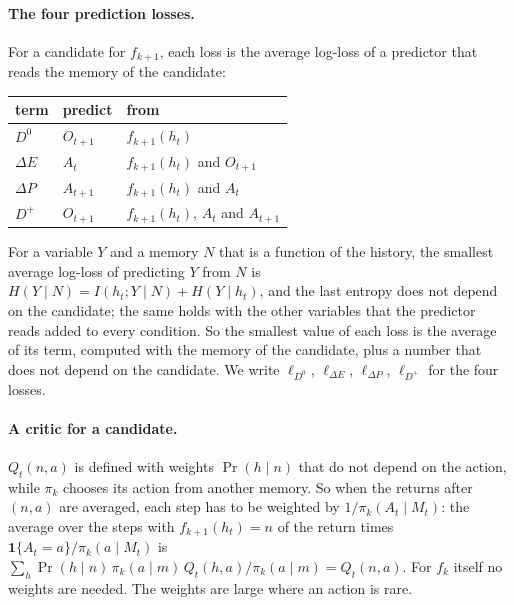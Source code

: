 \documentclass[11pt]{article}
\theoremstyle{definition}
\newcommand{\dE}{\Delta E}
\newcommand{\dP}{\Delta P}
\begin{document}
\paragraph{The four prediction losses.} For a candidate for $f_{k+1}$, each loss is the average log-loss of a predictor that reads the memory of the candidate:
\begin{center}
\small
\begin{tabular}{lll}
\hline
term & predict & from\\
\hline
$D^0$ & $O_{t+1}$ & $f_{k+1}(h_t)$\\
$\dE$ & $A_t$ & $f_{k+1}(h_t)$ and $O_{t+1}$\\
$\dP$ & $A_{t+1}$ & $f_{k+1}(h_t)$ and $A_t$\\
$D^+$ & $O_{t+1}$ & $f_{k+1}(h_t)$, $A_t$ and $A_{t+1}$\\
\hline
\end{tabular}
\end{center}
For a variable $Y$ and a memory $N$ that is a function of the history, the smallest average log-loss of predicting $Y$ from $N$ is $H(Y\mid N)=I(h_t;Y\mid N)+H(Y\mid h_t)$, and the last entropy does not depend on the candidate; the same holds with the other variables that the predictor reads added to every condition. So the smallest value of each loss is the average of its term, computed with the memory of the candidate, plus a number that does not depend on the candidate. We write $\ell_{D^0}$, $\ell_{\dE}$, $\ell_{\dP}$, $\ell_{D^+}$ for the four losses.

\paragraph{A critic for a candidate.} $Q_t(n,a)$ is defined with weights $\Pr(h\mid n)$ that do not depend on the action, while $\pi_k$ chooses its action from another memory. So when the returns after $(n,a)$ are averaged, each step has to be weighted by $1/\pi_k(A_t\mid M_t)$: the average over the steps with $f_{k+1}(h_t)=n$ of the return times $\mathbf 1\{A_t=a\}/\pi_k(a\mid M_t)$ is $\sum_h\Pr(h\mid n)\,\pi_k(a\mid m)\,Q_t(h,a)/\pi_k(a\mid m)=Q_t(n,a)$. For $f_k$ itself no weights are needed. The weights are large where an action is rare.
\end{document}
